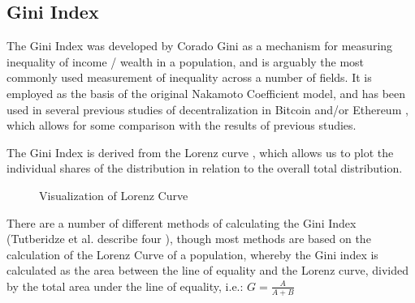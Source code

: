 \documentclass[conference]{IEEEtran}
\begin{document}
\vspace{2pt}

\subsection{Gini Index}

The Gini Index was developed by Corado Gini \cite{gini1936measure} as a mechanism for measuring inequality of income / wealth in a population, and is arguably the most commonly used measurement of inequality across a number of fields.   It is employed as the basis of the original Nakamoto Coefficient model, and has been used in several previous studies of decentralization in Bitcoin and/or Ethereum  \cite{sai2021characterizing, lee2021dq, gupta2018gini, kusmierz2022centralized, kwon2019impossibility, cong2023inclusion, gochhayat2020measuring, karakostas2022sok, zhang2022sok, campajola2022evolution}, which allows for some comparison with the results of previous studies.

The Gini Index is derived from the Lorenz curve \cite{lorenz1905methods}, which allows us to plot the individual shares of the distribution in relation to the overall total distribution.

\begin{figure}[h]


\caption{Visualization of Lorenz Curve}
\label{fig:lorenz-curve-graph}
\end{figure}


There are a number of different methods of calculating the Gini Index (Tutberidze et al. describe four \cite{tutberidze2018measuring}), though most methods are based on the calculation of the Lorenz Curve of a population, whereby the Gini index is calculated as the area between the line of equality and the Lorenz curve, divided by the total area under the line of equality, i.e.: \(G=\frac{A}{A+B}\)
\end{document}
